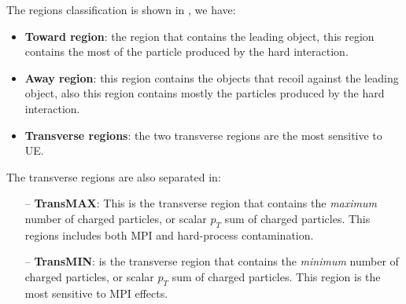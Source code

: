\bigskip

The regions classification is shown in , we have:
\begin{itemize}
	\item \textbf{Toward region}: the region that contains the leading object, this region contains the most of the particle produced by the hard interaction.
	\item \textbf{Away region}: this region contains the objects that recoil against the leading object, also this region contains mostly the particles produced by the hard interaction.
	\item \textbf{Transverse regions}: the two transverse regions are the most sensitive to UE.
\end{itemize}
The transverse regions are also separated in:
\begin{itemize}
	\item[--] \textbf{TransMAX}: This is the transverse region that contains the \textit{maximum} number of charged particles, or scalar $p_T$ sum of charged particles. This regions includes both MPI and hard-process contamination.
	\item[--] \textbf{TransMIN}: is the transverse region that contains the \textit{minimum} number of charged particles, or scalar $p_T$ sum of charged particles. This region is the most  sensitive to MPI effects.
\end{itemize}



